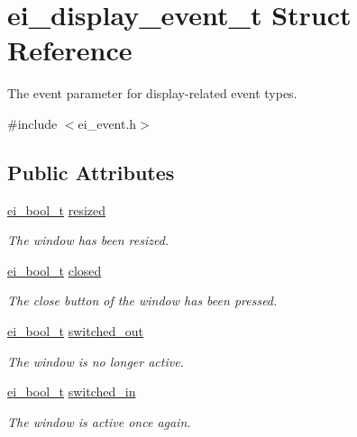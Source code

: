 \hypertarget{structei__display__event__t}{}\section{ei\+\_\+display\+\_\+event\+\_\+t Struct Reference}
\label{structei__display__event__t}


The event parameter for display-\/related event types.  




{\ttfamily \#include $<$ei\+\_\+event.\+h$>$}

\subsection*{Public Attributes}
\begin{DoxyCompactItemize}
\item 
\mbox{\label{structei__display__event__t_a32e23d401fad708e99701cde6d30e9d9}} 
\hyperlink{ei__types_8h_a383b9af13bd6a0a893096ead3c4d8e28}{ei\+\_\+bool\+\_\+t} \hyperlink{structei__display__event__t_a32e23d401fad708e99701cde6d30e9d9}{resized}
\begin{DoxyCompactList}\small\item\em The window has been resized. \end{DoxyCompactList}\item 
\mbox{\label{structei__display__event__t_a29dcb5bdf052575615f3566839c630ce}} 
\hyperlink{ei__types_8h_a383b9af13bd6a0a893096ead3c4d8e28}{ei\+\_\+bool\+\_\+t} \hyperlink{structei__display__event__t_a29dcb5bdf052575615f3566839c630ce}{closed}
\begin{DoxyCompactList}\small\item\em The close button of the window has been pressed. \end{DoxyCompactList}\item 
\mbox{\label{structei__display__event__t_ae688be60429c4516a9ba9a0813902252}} 
\hyperlink{ei__types_8h_a383b9af13bd6a0a893096ead3c4d8e28}{ei\+\_\+bool\+\_\+t} \hyperlink{structei__display__event__t_ae688be60429c4516a9ba9a0813902252}{switched\+\_\+out}
\begin{DoxyCompactList}\small\item\em The window is no longer active. \end{DoxyCompactList}\item 
\mbox{\label{structei__display__event__t_a42bd677878c67d8b4262b0e3db22fbc8}} 
\hyperlink{ei__types_8h_a383b9af13bd6a0a893096ead3c4d8e28}{ei\+\_\+bool\+\_\+t} \hyperlink{structei__display__event__t_a42bd677878c67d8b4262b0e3db22fbc8}{switched\+\_\+in}
\begin{DoxyCompactList}\small\item\em The window is active once again. \end{DoxyCompactList}\end{DoxyCompactItemize}



